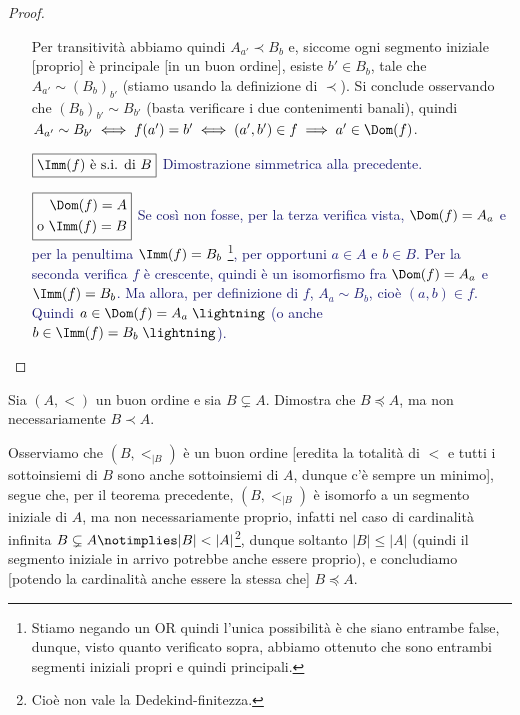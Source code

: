 \documentclass[11pt]{scrartcl}
\begin{document}
\begin{proof}
\begin{itemize}
{		Per transitività abbiamo quindi $A_{a'}\prec B_b$ e, siccome ogni segmento iniziale [proprio] è principale [in un buon ordine], esiste $b' \in B_b$, tale che $A_{a'} \sim (B_b)_{b'}$ (stiamo usando la definizione di $\prec$).
		Si conclude osservando che $(B_b)_{b'} \sim B_{b'}$ (basta verificare i due contenimenti banali), quindi $A_{a'}\sim B_{b'} \iff f(a') = b' \iff (a',b') \in f \implies a' \in \Dom(f)$.}
		\item[$\boxed{\text{$\Imm(f)$ è s.i. di $B$}}$] \textcolor{MidnightBlue}{Dimostrazione simmetrica alla precedente.}
		\item[$\boxed{\begin{aligned}\text{$\Dom(f) = A$} \\ \text{o $\Imm(f) = B$}\end{aligned}}$] \textcolor{MidnightBlue}{Se così non fosse, per la terza verifica vista, $\Dom(f) = A_a$ e per la penultima $\Imm(f) = B_b$ \footnote{Stiamo negando un OR quindi
		l'unica possibilità è che siano entrambe false, dunque, visto quanto verificato sopra, abbiamo ottenuto che sono entrambi segmenti iniziali propri e quindi principali.}, per opportuni $a \in A$ e $b \in B$. Per la seconda verifica $f$ è crescente, quindi è un isomorfismo fra $\Dom(f) = A_a$ e $\Imm(f) = B_b$.
		Ma allora, per definizione di $f$, $A_a \sim B_b$, cioè $(a,b) \in f$. Quindi $a \in \Dom(f) = A_a \; \lightning$ (o anche $b \in \Imm(f) = B_b \; \lightning$).}
	\end{itemize}
\end{proof}

\begin{exercise}
	Sia $(A,<)$ un buon ordine e sia $B \subsetneq A$. Dimostra che $B \preceq A$, ma non necessariamente $B \prec A$.
\end{exercise}

\begin{soln}
	Osserviamo che $(B,<_{|B})$ è un buon ordine [eredita la totalità di $<$ e tutti i sottoinsiemi di $B$ sono anche sottoinsiemi di $A$, dunque c'è sempre un minimo],
	segue che, per il teorema precedente, $(B,<_{|B})$ è isomorfo a un segmento iniziale di $A$, ma non necessariamente proprio,
 	infatti nel caso di cardinalità infinita $B \subsetneq A \notimplies |B|<|A|$\footnote{Cioè non vale la Dedekind-finitezza.}, dunque soltanto $|B|\leq|A|$ (quindi il segmento iniziale in arrivo potrebbe anche essere proprio), e concludiamo [potendo la cardinalità anche essere la stessa che] $B \preceq A$.
\end{soln}
\end{document}
